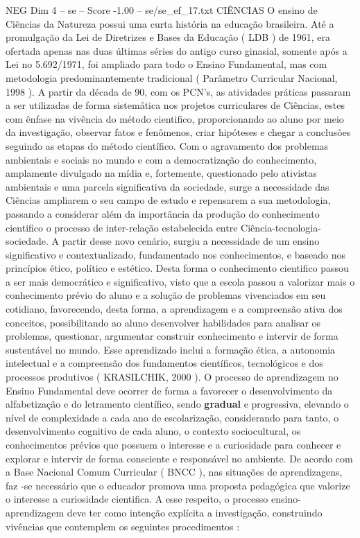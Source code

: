 \begin{textsample}{NEG Dim 4 – se – Score -1.00 – se/se\_ef\_17.txt}  \label{ex:f4_neg_141}
CIÊNCIAS O ensino de Ciências da Natureza possui uma curta história na educação brasileira.
Até a promulgação da Lei de Diretrizes e Bases da Educação ( LDB ) de 1961, era ofertada apenas nas duas últimas séries do antigo curso ginasial, somente após a Lei no 5.692/1971, foi ampliado para todo o Ensino Fundamental, mas com metodologia predominantemente tradicional ( Parâmetro Curricular Nacional, 1998 ).
A partir da década de 90, com os PCN’s, as atividades práticas passaram a ser utilizadas de forma sistemática nos projetos curriculares de Ciências, estes com ênfase na vivência do método cientifico, proporcionando ao aluno por meio da investigação, observar fatos e fenômenos, criar hipóteses e chegar a conclusões seguindo as etapas do método científico.
Com o agravamento dos problemas ambientais e sociais no mundo e com a democratização do conhecimento, amplamente divulgado na mídia e, fortemente, questionado pelo ativistas ambientais e uma parcela significativa da sociedade, surge a necessidade das Ciências ampliarem o seu campo de estudo e repensarem a sua metodologia, passando a considerar além da importância da produção do conhecimento cientifico o processo de inter-relação estabelecida entre Ciência-tecnologia-sociedade.
A partir desse novo cenário, surgiu a necessidade de um ensino significativo e contextualizado, fundamentado nos conhecimentos, e baseado nos princípios ético, político e estético.
Desta forma o conhecimento cientifico passou a ser mais democrático e significativo, visto que a escola passou a valorizar mais o conhecimento prévio do aluno e a solução de problemas vivenciados em seu cotidiano, favorecendo, desta forma, a aprendizagem e a compreensão ativa dos conceitos, possibilitando ao aluno desenvolver habilidades para analisar os problemas, questionar, argumentar construir conhecimento e intervir de forma sustentável no mundo.
Esse aprendizado inclui a formação ética, a autonomia intelectual e a compreensão dos fundamentos científicos, tecnológicos e dos processos produtivos ( KRASILCHIK, 2000 ).
O processo de aprendizagem no Ensino Fundamental deve ocorrer de forma a favorecer o desenvolvimento da alfabetização e do letramento científico, sendo \textbf{gradual} e progressiva, elevando o nível de complexidade a cada ano de escolarização, considerando para tanto, o desenvolvimento cognitivo de cada aluno, o contexto sociocultural, os conhecimentos prévios que possuem o interesse e a curiosidade para conhecer e explorar e intervir de forma consciente e responsável no ambiente.
De acordo com a Base Nacional Comum Curricular ( BNCC ), nas situações de aprendizagens, faz -se necessário que o educador promova uma proposta pedagógica que valorize o interesse a curiosidade cientifica.
A esse respeito, o processo ensino-aprendizagem deve ter como intenção explícita a investigação, construindo vivências que contemplem os seguintes procedimentos :

\end{textsample}
